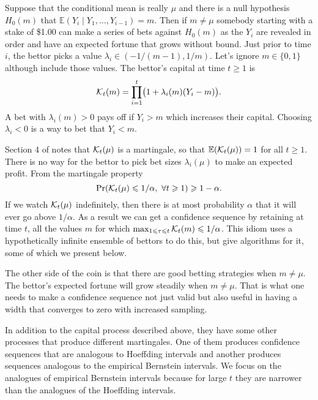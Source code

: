 \documentclass{article}
\renewcommand{\le}{\leqslant}
\renewcommand{\ge}{\geqslant}
\newcommand{\e}{\mathbb{E}}
\newcommand{\giv}{\!\mid\!} %
\begin{document}
Suppose that the conditional mean is really $\mu$ and 
there is a null hypothesis $H_0(m)$ that
$\e(Y_i\giv Y_1,\dots, Y_{i-1})=m$. Then if $m\ne\mu$
somebody starting with a stake of \$1.00 can
make a series of bets against $H_0(m)$
as the $Y_i$ are revealed in order
and have an expected fortune that grows without bound.
Just prior to time $i$, the bettor picks a value
$\lambda_i\in(-1/(m-1),1/m)$. Let's ignore $m\in\{0,1\}$
although \cite{WauRam24a} include those values. The bettor's
capital at time $t\ge1$ is
$$
\mathcal{K}_t(m)= \prod_{i=1}^t\bigl(1+\lambda_i(m)(Y_i-m)\bigr).
$$
A bet with $\lambda_i(m)>0$ pays off if $Y_i>m$ which
increases their capital. Choosing $\lambda_i<0$ is a 
way to bet that $Y_i<m$.

Section 4 of \cite{WauRam24a} notes that $\mathcal{K}_t(\mu)$ is
a martingale, so that $\e(\ck_t(\mu))=1$ for all $t\ge1$.
There is no way for the bettor to pick bet sizes $\lambda_i(\mu)$
to make an expected profit.    From the martingale
property
$$
\Pr( \ck_t(\mu)\le 1/\alpha,\ \forall t\ge1)\ge1-\alpha.
$$
If we watch $\mathcal{K}_t(\mu)$ indefinitely, then
there is at most probability $\alpha$ that it will
ever go above $1/\alpha$.  As a result we can get
a confidence sequence by retaining at time $t$,
all the values $m$ for 
which $\max_{1\le\tau\le t}\ck_t(m)\le1/\alpha$.
This idiom uses a hypothetically infinite ensemble of 
bettors to do this, but \cite{WauRam24a} give
algorithms for it, some of which we present below.

The other side of the coin is that there are good betting
strategies when $m\ne\mu$.  The bettor's expected fortune
will grow steadily when $m\ne\mu$. That is what one needs
to make a confidence sequence not just valid but also useful
in having a width that converges to zero with increased sampling.

In addition to the capital process described
above, they have some other processes that
produce different martingales. One of them produces confidence
sequences that are analogous to Hoeffding intervals
and another produces sequences analogous to the
empirical Bernstein intervals.  We focus on the analogues 
of empirical Bernstein intervals because for large $t$
they are narrower than the analogues of the Hoeffding intervals.
\end{document}
